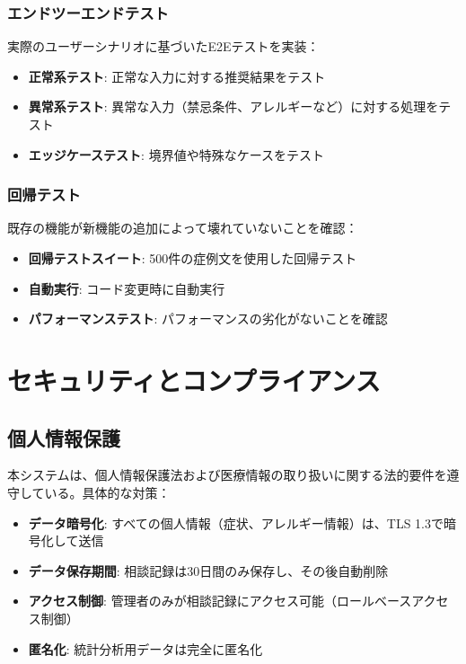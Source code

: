 \documentclass[a4paper,11pt,ja=standard,xelatex]{bxjsarticle}
\theoremstyle{definition}
\begin{document}
\subsubsection{エンドツーエンドテスト}

実際のユーザーシナリオに基づいたE2Eテストを実装：
\begin{itemize}
\item \textbf{正常系テスト}: 正常な入力に対する推奨結果をテスト
\item \textbf{異常系テスト}: 異常な入力（禁忌条件、アレルギーなど）に対する処理をテスト
\item \textbf{エッジケーステスト}: 境界値や特殊なケースをテスト
\end{itemize}

\subsubsection{回帰テスト}

既存の機能が新機能の追加によって壊れていないことを確認：
\begin{itemize}
\item \textbf{回帰テストスイート}: 500件の症例文を使用した回帰テスト
\item \textbf{自動実行}: コード変更時に自動実行
\item \textbf{パフォーマンステスト}: パフォーマンスの劣化がないことを確認
\end{itemize}

\section{セキュリティとコンプライアンス}

\subsection{個人情報保護}

本システムは、個人情報保護法および医療情報の取り扱いに関する法的要件を遵守している。具体的な対策：

\begin{itemize}
\item \textbf{データ暗号化}: すべての個人情報（症状、アレルギー情報）は、TLS 1.3で暗号化して送信
\item \textbf{データ保存期間}: 相談記録は30日間のみ保存し、その後自動削除
\item \textbf{アクセス制御}: 管理者のみが相談記録にアクセス可能（ロールベースアクセス制御）
\item \textbf{匿名化}: 統計分析用データは完全に匿名化
\end{itemize}
\end{document}
